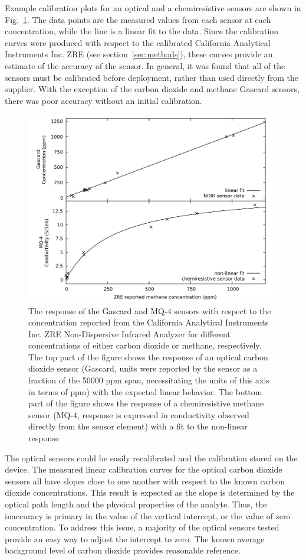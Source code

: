 \documentclass[times]{joehreview}
\begin{document}
	Example calibration plots for an optical and a chemiresistive sensors are shown in Fig.~\ref{fig:gascardcodiff}.  The data points are the measured values from each sensor at each concentration, while the line is a linear fit to the data.  Since the calibration curves were produced with respect to the calibrated California Analytical Instruments Inc. ZRE (see section~\ref{sec:methods}), these curves provide an estimate of the accuracy of the sensor.  In general, it was found that all of the sensors must be calibrated before deployment, rather than used directly from the supplier.  With the exception of the carbon dioxide and methane Gascard sensors, there was poor accuracy without an initial calibration.
	
	\begin{figure}[!t]
		\centering
		\includegraphics[width=0.9\columnwidth]{honey9.pdf}
		\caption{The response of the Gascard and MQ-4 sensors with respect to the concentration reported from the California Analytical Instruments Inc. ZRE Non-Dispersive Infrared Analyzer for different concentrations of either carbon dioxide or methane, respectively.  The top part of the figure shows the response of an optical carbon dioxide sensor (Gascard, units were reported by the sensor as a fraction of the 50000 ppm span, necessitating the units of this axis in terms of ppm) with the expected linear behavior.  The bottom part of the figure shows the response of a chemiresistive methane sensor (MQ-4, response is expressed in conductivity observed directly from the sensor element) with a fit to the non-linear response}
		\label{fig:gascardcodiff}
	\end{figure}
	
	The optical sensors could be easily recalibrated and the calibration stored on the device.  The measured linear calibration curves for the optical carbon dioxide sensors all have slopes close to one another with respect to the known carbon dioxide concentrations.  This result is expected as the slope is determined by the optical path length and the physical properties of the analyte.  Thus, the inaccuracy is primary in the value of the vertical intercept, or the value of zero concentration.  To address this issue, a majority of the optical sensors tested provide an easy way to adjust the intercept to zero.  The known average background level of carbon dioxide provides reasonable reference.
	
\end{document}
